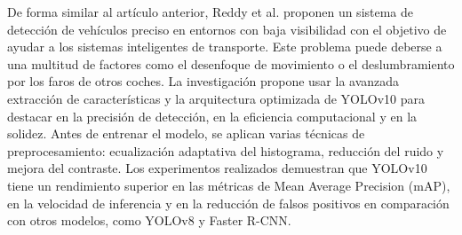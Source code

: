\documentclass[12pt,a4paper,onecolumn,oneside]{report}
\begin{document}
De forma similar al artículo anterior, Reddy et al. \cite{articleReddy} proponen un sistema de detección de vehículos preciso en entornos con baja visibilidad con el objetivo de ayudar a los sistemas inteligentes de transporte. Este problema puede deberse a una multitud de factores como el desenfoque de movimiento o el deslumbramiento por los faros de otros coches. La investigación propone usar la avanzada extracción de características y la arquitectura optimizada de YOLOv10 para destacar en la precisión de detección, en la eficiencia computacional y en la solidez. Antes de entrenar el modelo, se aplican varias técnicas de preprocesamiento: ecualización adaptativa del histograma, reducción del ruido y mejora del contraste. Los experimentos realizados demuestran que YOLOv10 tiene un rendimiento superior en las métricas de Mean Average Precision (mAP), en la velocidad de inferencia y en la reducción de falsos positivos en comparación con otros modelos, como YOLOv8 y Faster R-CNN.
\end{document}

